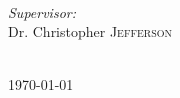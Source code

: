 \begin{titlingpage}
\begin{minipage}{0.4\textwidth}
\begin{flushleft}
    \end{flushleft}
    \end{minipage}
    ~
    \begin{minipage}{0.5\textwidth}
    \begin{flushright} \large
    \emph{Supervisor:} \\
    Dr. Christopher \textsc{Jefferson} %
    \end{flushright}
\end{minipage}\\[2cm]
{\large \today}\\[2cm] %
\vfill %
\end{titlingpage}
